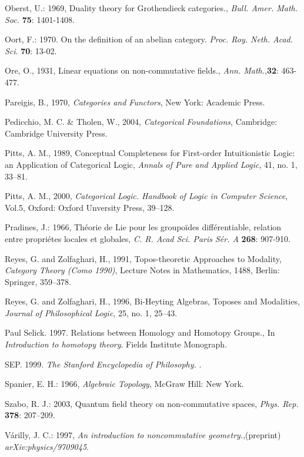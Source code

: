 \documentclass[12pt]{article}
\theoremstyle{plain}
\theoremstyle{definition}
\numberwithin{equation}{section}
\begin{document}
\begin{thebibliography}{9}
Oberst, U.: 1969, Duality theory for Grothendieck categories., \emph{Bull. Amer. Math. Soc.} \textbf{75}: 1401-1408.

Oort, F.: 1970. On the definition of an abelian category. \emph{Proc. Roy. Neth. Acad. Sci}. \textbf{70}: 13-02.

Ore, O., 1931, Linear equations on non-commutative fields., {\em Ann. Math.},\textbf{32}: 463-477.

Pareigis, B., 1970, {\em Categories and Functors}, New York: Academic Press. 

Pedicchio, M. C. \& Tholen, W., 2004, {\em Categorical Foundations}, Cambridge: Cambridge University Press.  

Pitts, A. M., 1989, Conceptual Completeness for First-order Intuitionistic Logic: an Application 
of Categorical Logic, {\em Annals of Pure and Applied Logic}, 41, no. 1, 33--81. 

Pitts, A. M., 2000, {\em Categorical Logic. Handbook of Logic in Computer Science}, Vol.5, Oxford: Oxford Unversity Press, 39--128.

Pradines, J.: 1966, Th\'eorie de Lie pour les groupo\"ides diff\'erentiable, relation entre propri\'etes locales et globales, \emph{C. R. Acad Sci. Paris S\'er. A} \textbf{268}: 907-910.

Reyes, G. and Zolfaghari, H., 1991, Topos-theoretic Approaches to Modality, 
{\em Category Theory (Como 1990)}, Lecture Notes in Mathematics, 1488, Berlin: Springer, 359--378. 

Reyes, G. and Zolfaghari, H., 1996, Bi-Heyting Algebras, Toposes and Modalities, 
{\em Journal of Philosophical Logic}, 25, no. 1, 25--43.

Paul Selick. 1997. Relations between Homology and Homotopy Groups., In {\em Introduction to homotopy theory}. 
Fields Institute Monograph.

SEP. 1999. {\em The Stanford Encyclopedia of Philosophy.} 
. 

Spanier, E. H.: 1966, \emph{Algebraic Topology}, McGraw Hill: New York.

Szabo, R. J.: 2003, Quantum field theory on non-commutative spaces,
\emph{Phys. Rep.} \textbf{378}: 207--209.

V\'arilly, J. C.: 1997, {\em An introduction to noncommutative geometry.},(preprint)
\emph{arXiv:physics/9709045}.

\end{thebibliography} 
\end{document}
